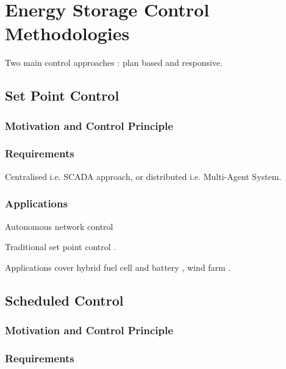 \section{Energy Storage Control Methodologies}
\label{ch-review:sec:energy-storage-control-methodologies}

Two main control approaches \cite{Hida2010}: plan based and responsive.


\subsection{Set Point Control}

\subsubsection{Motivation and Control Principle}

\subsubsection{Requirements}

Centralised i.e. SCADA approach, or distributed i.e. Multi-Agent System.

\subsubsection{Applications}

Autonomous network control \cite{Nogaret1997a}

Traditional set point control \cite{Leadbetter2012}.

Applications cover hybrid fuel cell and battery \cite{Jiang2007}, wind farm \cite{Teleke2009a}.

\subsection{Scheduled Control}

\subsubsection{Motivation and Control Principle}

\subsubsection{Requirements}

